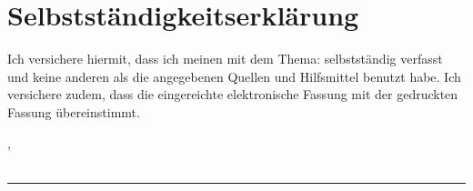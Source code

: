 \thispagestyle{empty}

\section*{Selbstständigkeitserklärung}
\vspace*{2em}


Ich versichere hiermit, dass ich meinen {\myArbeit} mit dem Thema: {\itshape \myTitel } selbstständig verfasst und keine anderen als die angegebenen Quellen und Hilfsmittel benutzt habe. Ich versichere zudem, dass die eingereichte elektronische Fassung mit der gedruckten Fassung übereinstimmt.


\vspace{3em}
\noindent
\myAbgabeort, \myDatum
\\
\\
\noindent
\rule{6cm}{0.4pt}\\
\myAutor
